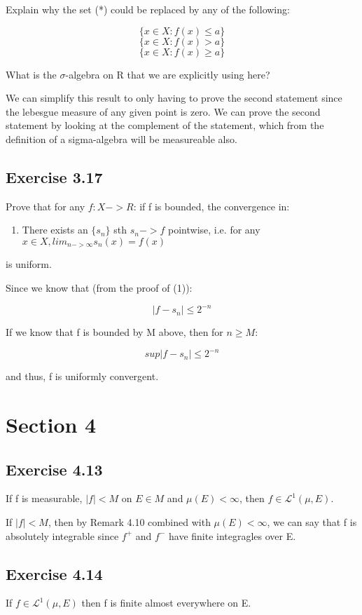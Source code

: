\documentclass[a4paper]{article}
\begin{document}
Explain why the set (*) could be replaced by any of the following:

$$\{ x \in X : f(x) \leq a\}$$
$$\{ x \in X : f(x) > a\}$$
$$\{ x \in X : f(x) \geq a\}$$

What is the $\sigma$-algebra on R that we are explicitly using here?

We can simplify this result to only having to prove the second statement since the lebesgue measure of any given point is zero. We can prove the second statement by looking at the complement of the statement, which from the definition of a sigma-algebra will be measureable also.


\subsection*{Exercise 3.17}
Prove that for any $f : X -> R$: if f is bounded, the convergence in:
\begin{enumerate}
  \item There exists an $\{s_n\}$ sth $s_n -> f$ pointwise, i.e. for any $x\in X, lim_{n->\infty}s_n(x) = f(x)$
\end{enumerate}
is uniform.

Since we know that (from the proof of (1)):

$$| f - s_n| \leq 2^{-n}$$

If we know that  f is bounded by M above, then for $n\geq M$:

$$sup|f -s_n| \leq 2^{-n}$$

and thus, f is uniformly convergent.

\section*{ Section 4}

\subsection*{Exercise 4.13}
If f is measurable, $|f| < M$ on $E \in M$ and $\mu(E) <\infty$, then $f \in \mathcal{L}^1 (\mu, E)$.

If $|f| < M$, then by Remark 4.10 combined with $\mu(E) < \infty$, we can say that f is absolutely integrable since $f^+$ and $f^-$ have finite integragles over E.


\subsection*{Exercise 4.14}
If $f \in \mathcal{L}^1 (\mu, E)$ then f is finite almost everywhere on E.
\end{document}

